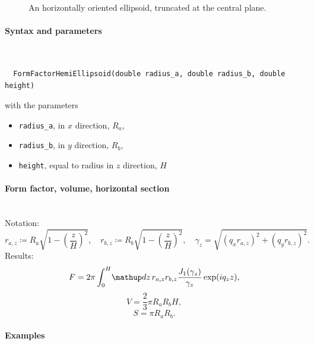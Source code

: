 \begin{figure}[H]
\hfill
{}
\hfill
{}
\hfill
{}
\hfill
\caption{An horizontally oriented ellipsoid, truncated at the central plane.}
\end{figure}

\paragraph{Syntax and parameters}\strut\\[-2ex plus .2ex minus .2ex]
\begin{lstlisting}
  FormFactorHemiEllipsoid(double radius_a, double radius_b, double height)
\end{lstlisting}
with the parameters
\begin{itemize}
\item \texttt{radius\_a}, in $x$ direction, $R_a$,
\item \texttt{radius\_b}, in $y$ direction, $R_b$,
\item \texttt{height}, equal to radius in $z$ direction, $H$
\end{itemize}

\paragraph{Form factor, volume, horizontal section}\strut\\
Notation:
\begin{equation*}
 r_{a,z} \coloneqq R_a \sqrt{1-\left(\dfrac{z}{H} \right)^2},\quad
 r_{b,z} \coloneqq R_b \sqrt{1-\left(\dfrac{z}{H} \right)^2}, \quad
 \gamma_z =\sqrt{(q_x r_{a,z})^2+(q_y r_{b,z})^2}.
\end{equation*}
Results:
\begin{equation*}
  F = 2\pi \int_0^{H} \!\d z\, r_{a,z} r_{b,z}
                               \frac{J_1(\gamma_z)}{\gamma_z}\exp(iq_z z),
\end{equation*}
\begin{equation*}
  V = \dfrac{2}{3}\pi R_a R_bH,
\end{equation*}
\begin{equation*}
  S =\pi R_a R_b.
\end{equation*}

\paragraph{Examples}\strut

